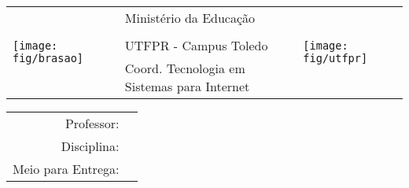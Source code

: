 
\noindent
\begin{tabular}{p{}m{}p{}}
	\multirow{4}{*}{\texttt{[image: fig/brasao]}} & \centering\scriptsize Ministério da Educação &\multirow{4}{*}{\texttt{[image: fig/utfpr]}} \\
	&\centering{\scriptsize \bf Universidade Tecnológica Federal do Paraná}&\\
	&\centering\scriptsize UTFPR - Campus Toledo&\\
	&\centering\scriptsize Coord. Tecnologia em Sistemas para Internet&
\end{tabular}

\noindent
{}

\makeatletter
\begin{center}
	\textbf{\@atividade}
\end{center}

\begin{center}
\begin{tabular}{rl}
	Professor: & \@professor\\
	Disciplina: & \@disciplina \\
	Meio para Entrega: & \@entrega \\
\end{tabular}
\end{center}
\makeatother

